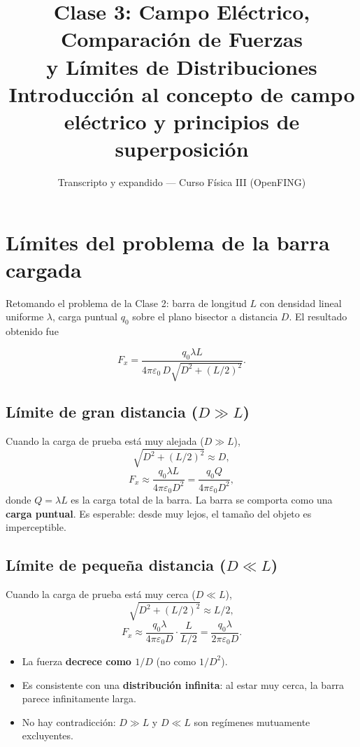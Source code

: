\documentclass[12pt,a4paper]{article}
\title{\textbf{Clase 3: Campo Eléctrico, Comparación de Fuerzas \\
        y Límites de Distribuciones}\\[0.3em]
        \large{Introducción al concepto de campo eléctrico y principios de superposición}}
\author{Transcripto y expandido --- Curso Física III (OpenFING)}
\date{}
\begin{document}
\maketitle
\thispagestyle{empty}
\newpage

\tableofcontents
\newpage

\section{Límites del problema de la barra cargada}

Retomando el problema de la Clase 2: barra de longitud $L$ con densidad
lineal uniforme $\lambda$, carga puntual $q_0$ sobre el plano bisector a
distancia $D$. El resultado obtenido fue

\[
F_x = \frac{q_0 \lambda L}{4\pi\varepsilon_0 \,
      D\sqrt{D^{2} + (L/2)^{2}}}.
\]

\subsection{Límite de gran distancia ($D \gg L$)}

Cuando la carga de prueba está muy alejada ($D \gg L$),
\[
\sqrt{D^{2} + (L/2)^{2}} \approx D,
\]
\[
F_x \approx \frac{q_0 \lambda L}{4\pi\varepsilon_0 D^{2}}
       = \frac{q_0 Q}{4\pi\varepsilon_0 D^{2}},
\]
donde $Q = \lambda L$ es la carga total de la barra. La barra se
comporta como una \textbf{carga puntual}. Es esperable: desde muy lejos,
el tamaño del objeto es imperceptible.

\subsection{Límite de pequeña distancia ($D \ll L$)}

Cuando la carga de prueba está muy cerca ($D \ll L$),
\[
\sqrt{D^{2} + (L/2)^{2}} \approx L/2,
\]
\[
F_x \approx \frac{q_0 \lambda}{4\pi\varepsilon_0 D} \cdot \frac{L}{L/2}
       = \frac{q_0 \lambda}{2\pi\varepsilon_0 D}.
\]

\begin{itemize}[nosep]
  \item La fuerza \textbf{decrece como $1/D$} (no como $1/D^{2}$).
  \item Es consistente con una \textbf{distribución infinita}: al estar
        muy cerca, la barra parece infinitamente larga.
  \item No hay contradicción: $D \gg L$ y $D \ll L$ son regímenes
        mutuamente excluyentes.
\end{itemize}
\end{document}
